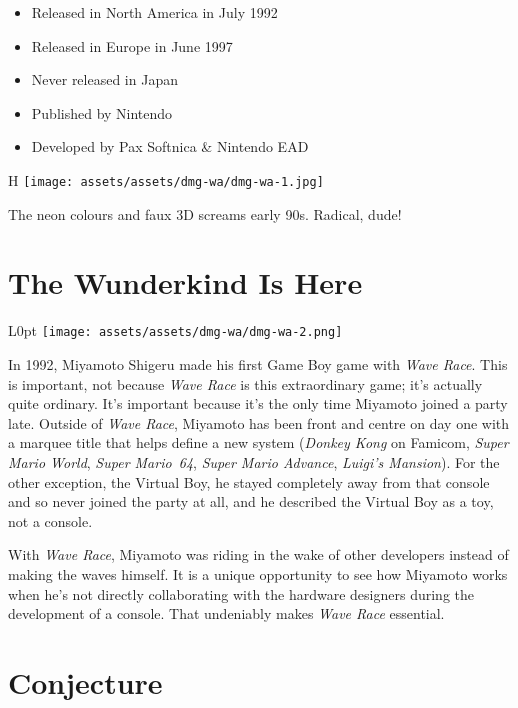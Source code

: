 \documentclass{book}
\begin{document}
\begin{itemize} \setlength\itemsep{-0.4em}
\item Released in North America in July 1992
\item Released in Europe in June 1997
\item Never released in Japan
\item Published by Nintendo
\item Developed by Pax Softnica \& Nintendo EAD
\end{itemize}\noindent

\begin{wrapfigure}{H}{\linewidth}
\vskip 4pt
\centering \texttt{[image: assets/assets/dmg-wa/dmg-wa-1.jpg]}\par\pagetwodescription The neon colours and faux 3D screams early 90s. Radical, dude!\end{wrapfigure}
\clearpage

\FloatBarrier\needspace{5pt}\section*{The Wunderkind Is Here}\nopagebreak[4]

\begin{wrapfigure}{L}{0pt} \texttt{[image: assets/assets/dmg-wa/dmg-wa-2.png]}\end{wrapfigure}
In 1992, Miyamoto Shigeru made his first Game Boy game with \emph{Wave Race}. This is important, not because \emph{Wave Race} is this extraordinary game; it’s actually quite ordinary. It’s important because it’s the only time Miyamoto joined a party late. Outside of \emph{Wave Race}, Miyamoto has been front and centre on day one with a marquee title that helps define a new system (\emph{Donkey Kong} on Famicom, \emph{Super Mario World}, \emph{Super Mario 64}, \emph{Super Mario Advance}, \emph{Luigi’s Mansion}). For the other exception, the Virtual Boy, he stayed completely away from that console and so never joined the party at all, and he described the Virtual Boy as a toy, not a console.

With \emph{Wave Race}, Miyamoto was riding in the wake of other developers instead of making the waves himself. It is a unique opportunity to see how Miyamoto works when he’s not directly collaborating with the hardware designers during the development of a console. That undeniably makes \emph{Wave Race} essential.

\FloatBarrier\needspace{5pt}\section*{Conjecture}\nopagebreak[4]
\end{document}
